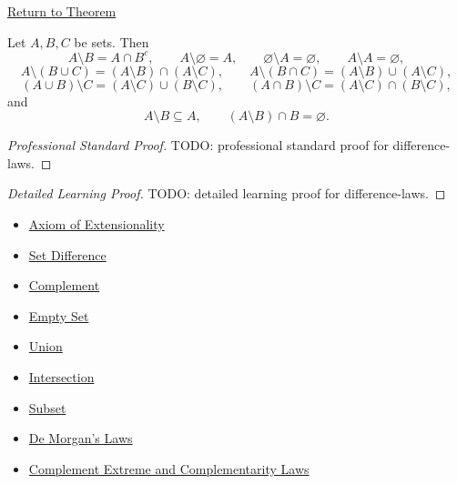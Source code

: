 \newpage
{}
\label{prf:difference-laws}

\begin{remark*}[Return]
\hyperref[thm:difference-laws]{Return to Theorem}
\end{remark*}

\begin{theorem*}
Let $A,B,C$ be sets. Then
\[
A\setminus B=A\cap B^c,
\qquad
A\setminus\varnothing=A,
\qquad
\varnothing\setminus A=\varnothing,
\qquad
A\setminus A=\varnothing,
\]
\[
A\setminus(B\cup C)=(A\setminus B)\cap(A\setminus C),
\qquad
A\setminus(B\cap C)=(A\setminus B)\cup(A\setminus C),
\]
\[
(A\cup B)\setminus C=(A\setminus C)\cup(B\setminus C),
\qquad
(A\cap B)\setminus C=(A\setminus C)\cap(B\setminus C),
\]
and
\[
A\setminus B\subseteq A,
\qquad
(A\setminus B)\cap B=\varnothing.
\]
\end{theorem*}

\begin{proof}[Professional Standard Proof]
\LRAProofBodyStart
TODO: professional standard proof for difference-laws.
\end{proof}

\begin{proof}[Detailed Learning Proof]
\LRAProofBodyStart
TODO: detailed learning proof for difference-laws.
\end{proof}

\begin{remark*}
\end{remark*}

\begin{dependencies}
\begin{itemize}
  \item \hyperref[ax:extensionality]{Axiom of Extensionality}
  \item \hyperref[def:set-difference]{Set Difference}
  \item \hyperref[def:complement]{Complement}
  \item \hyperref[def:empty-set]{Empty Set}
  \item \hyperref[def:union]{Union}
  \item \hyperref[def:intersection]{Intersection}
  \item \hyperref[def:subset]{Subset}
  \item \hyperref[thm:de-morgan]{De Morgan's Laws}
  \item \hyperref[thm:complement-laws]{Complement Extreme and Complementarity Laws}
\end{itemize}
\end{dependencies}

\clearpage
